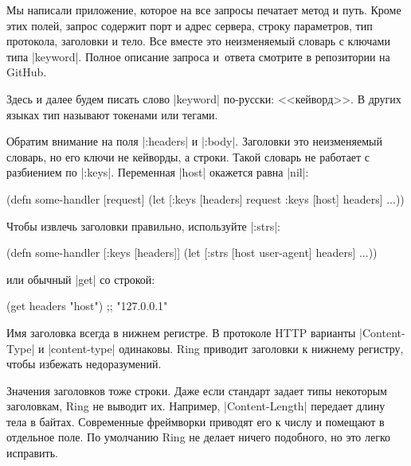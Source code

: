 Мы написали приложение, которое на все запросы печатает метод и путь. Кроме этих
полей, запрос содержит порт и адрес сервера, строку параметров, тип протокола,
заголовки и тело. Все вместе это неизменяемый словарь с ключами типа
\spverb|keyword|. Полное описание запроса и~ответа смотрите в репозитории на
GitHub.

Здесь и далее будем писать слово \spverb|keyword| по-русски: <<кейворд>>. В
других языках тип называют токенами или тегами.

Обратим внимание на поля \spverb|:headers| и \spverb|:body|. Заголовки это
неизменяемый словарь, но его ключи не кейворды, а строки. Такой словарь не
работает с разбиением по \spverb|:keys|. Переменная \spverb|host| окажется равна
\spverb|nil|:

\begin{english}
  \begin{clojure}
(defn some-handler
  [request]
  (let [{:keys [headers]} request
        {:keys [host]} headers]
    ...))
  \end{clojure}
\end{english}

Чтобы извлечь заголовки правильно, используйте \spverb|:strs|:

\begin{english}
  \begin{clojure}
(defn some-handler
  [{:keys [headers]}]
  (let [{:strs [host user-agent]} headers]
    ...))
  \end{clojure}
\end{english}

\noindent
или обычный \spverb|get| со строкой:

\begin{english}
  \begin{clojure}
(get headers "host") ;; "127.0.0.1"
  \end{clojure}
\end{english}

Имя заголовка всегда в нижнем регистре. В протоколе HTTP варианты
\spverb|Content-Type| и \spverb|content-type| одинаковы. Ring приводит
заголовки к нижнему регистру, чтобы избежать недоразумений.

Значения заголовков тоже строки. Даже если стандарт задает типы некоторым
заголовкам, Ring не выводит их. Например, \spverb|Content-Length|
передает длину тела в байтах. Современные фреймворки приводят его к числу и
помещают в отдельное поле. По умолчанию Ring не делает ничего подобного, но это
легко исправить.

